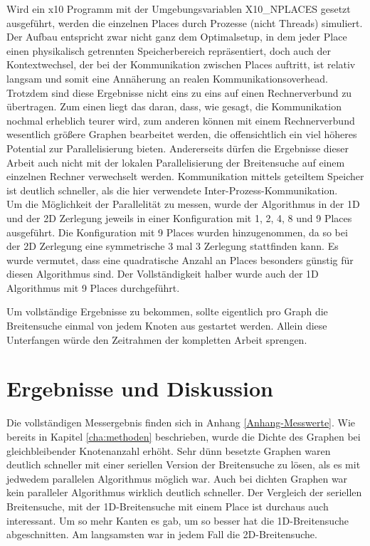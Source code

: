 Wird ein x10 Programm mit der Umgebungsvariablen X10\_NPLACES gesetzt ausgeführt, werden die einzelnen Places durch Prozesse (nicht Threads) simuliert. Der Aufbau entspricht zwar nicht ganz dem Optimalsetup, in dem jeder Place einen physikalisch getrennten Speicherbereich repräsentiert, doch auch der Kontextwechsel, der bei der Kommunikation zwischen Places auftritt, ist relativ langsam und somit eine Annäherung an realen Kommunikationsoverhead. Trotzdem sind diese Ergebnisse nicht eins zu eins auf einen Rechnerverbund zu übertragen. Zum einen liegt das daran, dass, wie gesagt, die Kommunikation nochmal erheblich teurer wird, zum anderen können mit einem Rechnerverbund wesentlich größere Graphen bearbeitet werden, die offensichtlich ein viel höheres Potential zur Parallelisierung bieten. Andererseits dürfen die Ergebnisse dieser Arbeit auch nicht mit der lokalen Parallelisierung der Breitensuche auf einem einzelnen Rechner verwechselt werden. Kommunikation mittels geteiltem Speicher ist deutlich schneller, als die hier verwendete Inter-Prozess-Kommunikation. \\
Um die Möglichkeit der Parallelität zu messen, wurde der Algorithmus in der 1D und der 2D Zerlegung jeweils in einer Konfiguration mit 1, 2, 4, 8 und 9 Places ausgeführt. Die Konfiguration mit 9 Places wurden hinzugenommen, da so bei der 2D Zerlegung eine symmetrische 3 mal 3 Zerlegung stattfinden kann. Es wurde vermutet, dass eine quadratische Anzahl an Places besonders günstig für diesen Algorithmus sind. Der Vollständigkeit halber wurde auch der 1D Algorithmus mit 9 Places durchgeführt.

Um vollständige Ergebnisse zu bekommen, sollte eigentlich pro Graph die Breitensuche einmal von jedem Knoten aus gestartet werden. Allein diese Unterfangen würde den Zeitrahmen der kompletten Arbeit sprengen.     

\chapter{Ergebnisse und Diskussion} %
\label{cha:ergebnisse_und_diskussion}

Die vollständigen Messergebnis finden sich in Anhang \ref{Anhang-Messwerte}. Wie bereits in Kapitel \ref{cha:methoden} beschrieben, wurde die Dichte des Graphen bei gleichbleibender Knotenanzahl erhöht. Sehr dünn besetzte Graphen waren deutlich schneller mit einer seriellen Version der Breitensuche zu lösen, als es mit jedwedem parallelen Algorithmus möglich war. Auch bei dichten Graphen war kein paralleler Algorithmus wirklich deutlich schneller. Der Vergleich der seriellen Breitensuche, mit der 1D-Breitensuche mit einem Place ist durchaus auch interessant. Um so mehr Kanten es gab, um so besser hat die 1D-Breitensuche abgeschnitten. Am langsamsten war in jedem Fall die 2D-Breitensuche.

